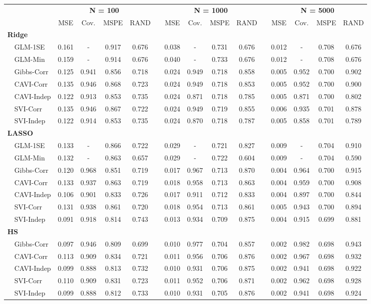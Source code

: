\begin{center}
\begin{tabular}{lcccccccccccccc}
\hline\hline
\multicolumn{1}{l}{\bfseries }&\multicolumn{4}{c}{\bfseries N = 100}&\multicolumn{1}{c}{\bfseries }&\multicolumn{4}{c}{\bfseries N = 1000}&\multicolumn{1}{c}{\bfseries }&\multicolumn{4}{c}{\bfseries N = 5000}\tabularnewline
\cline{2-5} \cline{7-10} \cline{12-15}
\multicolumn{1}{l}{}&\multicolumn{1}{c}{MSE}&\multicolumn{1}{c}{Cov.}&\multicolumn{1}{c}{MSPE}&\multicolumn{1}{c}{RAND}&\multicolumn{1}{c}{}&\multicolumn{1}{c}{MSE}&\multicolumn{1}{c}{Cov.}&\multicolumn{1}{c}{MSPE}&\multicolumn{1}{c}{RAND}&\multicolumn{1}{c}{}&\multicolumn{1}{c}{MSE}&\multicolumn{1}{c}{Cov.}&\multicolumn{1}{c}{MSPE}&\multicolumn{1}{c}{RAND}\tabularnewline
\hline
{\bfseries Ridge}&&&&&&&&&&&&&&\tabularnewline
~~GLM-1SE&0.161&-&0.917&0.676&&0.038&-&0.731&0.676&&0.012&-&0.708&0.676\tabularnewline
~~GLM-Min&0.159&-&0.914&0.676&&0.040&-&0.733&0.676&&0.012&-&0.708&0.676\tabularnewline
~~Gibbs-Corr&0.125&0.941&0.856&0.718&&0.024&0.949&0.718&0.858&&0.005&0.952&0.700&0.902\tabularnewline
~~CAVI-Corr&0.135&0.946&0.868&0.723&&0.024&0.949&0.718&0.853&&0.005&0.952&0.700&0.900\tabularnewline
~~CAVI-Indep&0.122&0.913&0.853&0.735&&0.024&0.871&0.718&0.785&&0.005&0.871&0.700&0.802\tabularnewline
~~SVI-Corr&0.135&0.946&0.867&0.722&&0.024&0.949&0.719&0.855&&0.006&0.935&0.701&0.878\tabularnewline
~~SVI-Indep&0.122&0.914&0.853&0.735&&0.024&0.870&0.718&0.787&&0.005&0.858&0.701&0.789\tabularnewline
\hline
{\bfseries LASSO}&&&&&&&&&&&&&&\tabularnewline
~~GLM-1SE&0.133&-&0.866&0.722&&0.029&-&0.721&0.827&&0.009&-&0.704&0.910\tabularnewline
~~GLM-Min&0.132&-&0.863&0.657&&0.029&-&0.722&0.604&&0.009&-&0.704&0.590\tabularnewline
~~Gibbs-Corr&0.120&0.968&0.851&0.719&&0.017&0.967&0.713&0.870&&0.004&0.964&0.700&0.915\tabularnewline
~~CAVI-Corr&0.133&0.937&0.863&0.719&&0.018&0.958&0.713&0.863&&0.004&0.959&0.700&0.908\tabularnewline
~~CAVI-Indep&0.106&0.901&0.833&0.726&&0.017&0.911&0.712&0.833&&0.004&0.897&0.700&0.844\tabularnewline
~~SVI-Corr&0.131&0.938&0.861&0.720&&0.018&0.954&0.713&0.861&&0.005&0.943&0.700&0.894\tabularnewline
~~SVI-Indep&0.091&0.918&0.814&0.743&&0.013&0.934&0.709&0.875&&0.004&0.915&0.699&0.881\tabularnewline
\hline
{\bfseries HS}&&&&&&&&&&&&&&\tabularnewline
~~Gibbs-Corr&0.097&0.946&0.809&0.699&&0.010&0.977&0.704&0.857&&0.002&0.982&0.698&0.943\tabularnewline
~~CAVI-Corr&0.113&0.909&0.834&0.721&&0.011&0.956&0.706&0.876&&0.002&0.967&0.698&0.932\tabularnewline
~~CAVI-Indep&0.099&0.888&0.813&0.732&&0.010&0.931&0.706&0.875&&0.002&0.941&0.698&0.922\tabularnewline
~~SVI-Corr&0.110&0.909&0.831&0.723&&0.011&0.952&0.706&0.871&&0.002&0.962&0.698&0.928\tabularnewline
~~SVI-Indep&0.099&0.888&0.812&0.733&&0.010&0.931&0.705&0.876&&0.002&0.941&0.698&0.924\tabularnewline
\hline
\end{tabular}\end{center}
